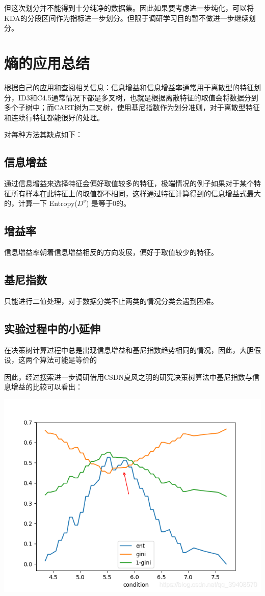 \documentclass[lang=cn,11pt]{elegantpaper}
\begin{document}
但这次划分并不能得到十分纯净的数据集。因此如果要考虑进一步纯化，可以将KDA的分段区间作为指标进一步划分。但限于调研学习目的暂不做进一步继续划分。

\section{熵的应用总结}
根据自己的应用和查阅相关信息：信息增益和信息增益率通常用于离散型的特征划分，ID3和C4.5通常情况下都是多叉树，也就是根据离散特征的取值会将数据分到多个子树中；而CART树为二叉树，使用基尼指数作为划分准则，对于离散型特征和连续行特征都能很好的处理。

对每种方法其缺点如下：
\subsection{信息增益}
通过信息增益来选择特征会偏好取值较多的特征，极端情况的例子如果对于某个特征所有样本在此特征上的取值都不相同，这样通过特征计算得到的信息增益式最大的，计算一下 Entropy($D^v$) 是等于0的。
\subsection{增益率}
信息增益率朝着信息增益相反的方向发展，偏好于取值较少的特征。
\subsection{基尼指数}
只能进行二值处理，对于数据分类不止两类的情况分类会遇到困难。
\subsection{实验过程中的小延伸}
在决策树计算过程中总是出现信息增益和基尼指数趋势相同的情况，因此，大胆假设，这两个算法可能是等价的

因此，经过搜索进一步调研借用CSDN夏风之羽的研究决策树算法中基尼指数与信息增益的比较可以看出：
\begin{center}
\includegraphics[scale=0.5]{pic2.png}\\
\end{center}
\end{document}
